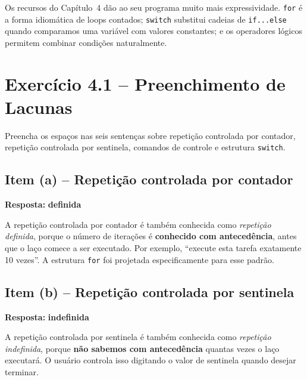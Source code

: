 \documentclass[12pt,a4paper]{article}
\begin{document}
\begin{boaprática}
  Os recursos do Capítulo~4 dão ao seu programa muito mais expressividade. \texttt{for}
  é a forma idiomática de loops contados; \texttt{switch} substitui cadeias de
  \texttt{if...else} quando comparamos uma variável com valores constantes; e os
  operadores lógicos permitem combinar condições naturalmente.
\end{boaprática}

\tableofcontents\newpage

\section{Exercício 4.1 -- Preenchimento de Lacunas}

\begin{enunciadoBox}[Enunciado 4.1]
Preencha os espaços nas seis sentenças sobre repetição controlada por contador,
repetição controlada por sentinela, comandos de controle e estrutura \texttt{switch}.
\end{enunciadoBox}

\subsection*{Item (a) -- Repetição controlada por contador}

\begin{respostabox}
\textbf{Resposta:} \textcolor{deitelblue}{\textbf{definida}}

A repetição controlada por contador é também conhecida como \textit{repetição definida},
porque o número de iterações é \textbf{conhecido com antecedência}, antes que o laço
comece a ser executado. Por exemplo, ``execute esta tarefa exatamente 10 vezes''.
A estrutura \texttt{for} foi projetada especificamente para esse padrão.
\end{respostabox}

\subsection*{Item (b) -- Repetição controlada por sentinela}

\begin{respostabox}
\textbf{Resposta:} \textcolor{deitelblue}{\textbf{indefinida}}

A repetição controlada por sentinela é também conhecida como \textit{repetição indefinida},
porque \textbf{não sabemos com antecedência} quantas vezes o laço executará. O usuário
controla isso digitando o valor de sentinela quando desejar terminar.
\end{respostabox}
\end{document}
